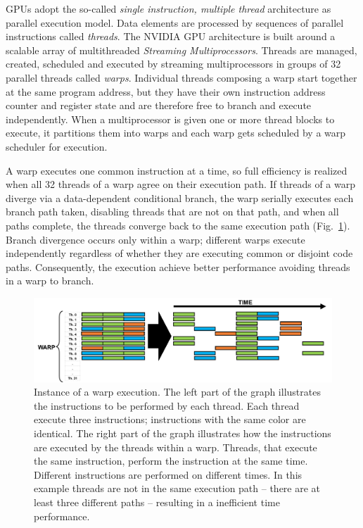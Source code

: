 GPUs adopt the so-called \textit{single instruction, multiple thread} architecture as parallel execution model. Data elements are processed by sequences of parallel instructions called \textit{threads}. The NVIDIA GPU architecture is built around a scalable array of multithreaded \textit{Streaming Multiprocessors}. Threads are managed, created, scheduled and executed by streaming multiprocessors in groups of 32 parallel threads called \textit{warps}. Individual threads composing a warp start together at the same program address, but they have their own instruction address counter and register state and are therefore free to branch and execute independently. When a multiprocessor is given one or more thread blocks to execute, it partitions them into warps and each warp gets scheduled by a warp scheduler for execution. 

A warp executes one common instruction at a time, so full efficiency is realized when all 32 threads of a warp agree on their execution path. If threads of a warp diverge via a data-dependent conditional branch, the warp serially executes each branch path taken, disabling threads that are not on that path, and when all paths complete, the threads converge back to the same execution path (Fig.~\ref{fig:warp-instruction}). Branch divergence occurs only within a warp; different warps execute independently regardless of whether they are executing common or disjoint code paths. Consequently, the execution achieve better performance avoiding threads in a warp to branch.
\begin{figure}
   \centering
   \includegraphics[width=14cm]{Figs/Warp_instruction.png}
   \caption{Instance of a warp execution. The left part of the graph illustrates the instructions to be performed by each thread. Each thread execute three instructions; instructions with the same color are identical. The right part of the graph illustrates how the instructions are executed by the threads within a warp. Threads, that execute the same instruction, perform the instruction at the same time. Different instructions are performed on different times. In this example threads are not in the same execution path -- there are at least three different paths -- resulting in a inefficient time performance.} \label{fig:warp-instruction}
\end{figure}

